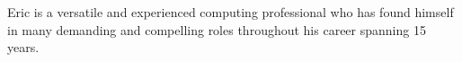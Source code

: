 

\begin{cvparagraph}

Eric is a versatile and experienced computing professional who has found himself in many
demanding and compelling roles throughout his career spanning 15 years. 
\end{cvparagraph}
